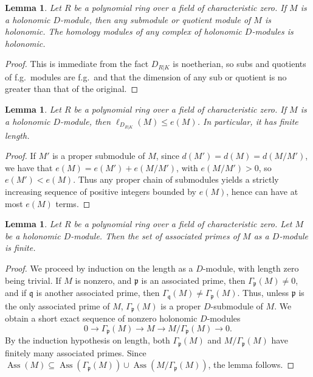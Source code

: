 \documentclass[11pt]{book}
\newtheorem{lemma}[theorem]{Lemma}
\numberwithin{equation}{section}
\numberwithin{theorem}{chapter}
\theoremstyle{definition}
\newtheorem*{basic properties}{Basic Properties}
\newtheorem*{Important Remark}{Important Remark}
\theoremstyle{remark}
\newcommand{\p}{\mathfrak{p}}
\newcommand{\q}{\mathfrak{q}}
\newcommand{\Ass}{\operatorname{Ass}}
\begin{document}
\begin{lemma}
	Let $R$ be a polynomial ring over a field of characteristic zero. If $M$ is a holonomic $D$-module, then any submodule or quotient module of $M$ is holonomic. The homology modules of any complex of holonomic $D$-modules is holonomic.
\end{lemma}
\begin{proof}
	This is immediate from the fact $D_{R|K}$ is noetherian, so subs and quotients of f.g.~modules are f.g.~and that the dimension of any sub or quotient is no greater than that of the original.
\end{proof}

\begin{lemma} Let $R$ be a polynomial ring over a field of characteristic zero. If $M$ is a holonomic $D$-module, then $\ell_{D_{R|K}}(M)\leq e(M)$. In particular, it has finite length.
\end{lemma}
\begin{proof}
	If $M'$ is a proper submodule of $M$, since $d(M')=d(M)=d(M/M')$, we have that $e(M)=e(M')+e(M/M')$, with $e(M/M')>0$, so $e(M')<e(M)$. Thus any proper chain of submodules yields a strictly increasing sequence of positive integers bounded by $e(M)$, hence can have at most $e(M)$ terms.
\end{proof}

\begin{lemma}
	Let $R$ be a polynomial ring over a field of characteristic zero. Let $M$ be a holonomic $D$-module. Then the set of associated primes of $M$ as a $D$-module is finite.
\end{lemma}
\begin{proof}
	We proceed by induction on the length as a $D$-module, with length zero being trivial. If $M$ is nonzero, and $\p$ is an associated prime, then $\Gamma_{\p}(M)\neq 0$, and if $\q$ is another associated prime, then $\Gamma_{\q}(M)\neq \Gamma_{\p}(M)$. Thus, unless $\p$ is the only associated prime of $M$, $\Gamma_{\p}(M)$ is a proper $D$-submodule of $M$. We obtain a short exact sequence of nonzero holonomic $D$-modules
	\[ 0 \to \Gamma_{\p}(M) \to M \to M/\Gamma_{\p}(M) \to 0.\]
	By the induction hypothesis on length, both $\Gamma_{\p}(M)$ and $M/\Gamma_{\p}(M)$ have finitely many associated primes. Since $\Ass(M) \subseteq \Ass(\Gamma_{\p}(M)) \cup \Ass(M/\Gamma_{\p}(M))$, the lemma follows.
\end{proof}
\end{document}
